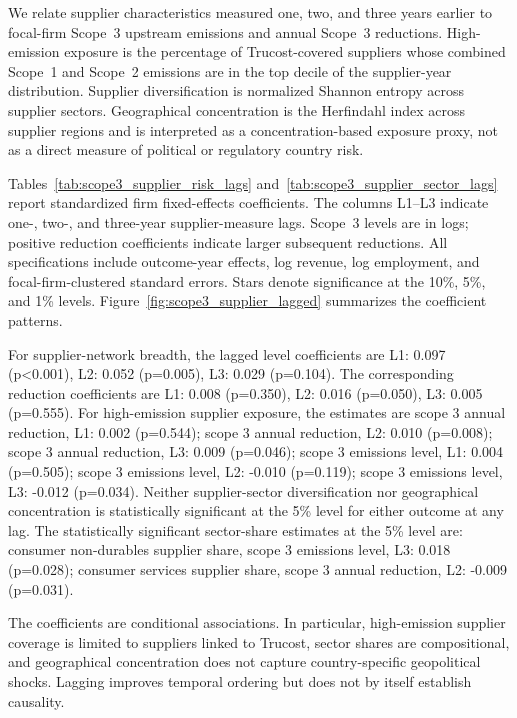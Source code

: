 We relate supplier characteristics measured one, two, and three years earlier to focal-firm Scope~3 upstream emissions and annual Scope~3 reductions. High-emission exposure is the percentage of Trucost-covered suppliers whose combined Scope~1 and Scope~2 emissions are in the top decile of the supplier-year distribution. Supplier diversification is normalized Shannon entropy across supplier sectors. Geographical concentration is the Herfindahl index across supplier regions and is interpreted as a concentration-based exposure proxy, not as a direct measure of political or regulatory country risk.

Tables~\ref{tab:scope3_supplier_risk_lags} and~\ref{tab:scope3_supplier_sector_lags} report standardized firm fixed-effects coefficients. The columns L1--L3 indicate one-, two-, and three-year supplier-measure lags. Scope~3 levels are in logs; positive reduction coefficients indicate larger subsequent reductions. All specifications include outcome-year effects, log revenue, log employment, and focal-firm-clustered standard errors. Stars denote significance at the 10\%, 5\%, and 1\% levels. Figure~\ref{fig:scope3_supplier_lagged} summarizes the coefficient patterns.

For supplier-network breadth, the lagged level coefficients are L1: 0.097 (p<0.001), L2: 0.052 (p=0.005), L3: 0.029 (p=0.104). The corresponding reduction coefficients are L1: 0.008 (p=0.350), L2: 0.016 (p=0.050), L3: 0.005 (p=0.555). For high-emission supplier exposure, the estimates are scope 3 annual reduction, L1: 0.002 (p=0.544); scope 3 annual reduction, L2: 0.010 (p=0.008); scope 3 annual reduction, L3: 0.009 (p=0.046); scope 3 emissions level, L1: 0.004 (p=0.505); scope 3 emissions level, L2: -0.010 (p=0.119); scope 3 emissions level, L3: -0.012 (p=0.034). Neither supplier-sector diversification nor geographical concentration is statistically significant at the 5\% level for either outcome at any lag. The statistically significant sector-share estimates at the 5\% level are: consumer non-durables supplier share, scope 3 emissions level, L3: 0.018 (p=0.028); consumer services supplier share, scope 3 annual reduction, L2: -0.009 (p=0.031).

The coefficients are conditional associations. In particular, high-emission supplier coverage is limited to suppliers linked to Trucost, sector shares are compositional, and geographical concentration does not capture country-specific geopolitical shocks. Lagging improves temporal ordering but does not by itself establish causality.

